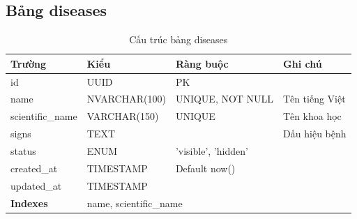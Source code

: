 \documentclass[12pt,a4paper]{article}
\begin{document}
\subsection{Bảng diseases}
\begin{longtable}{|l|l|l|p{5.5cm}|}
    \caption{Cấu trúc bảng diseases}                                                                        \\
    \hline
    \rowcolor{headerblue}
    \textbf{Trường}  & \textbf{Kiểu}                               & \textbf{Ràng buộc}  & \textbf{Ghi chú} \\
    \hline
    id               & UUID                                        & PK                  &                  \\
    \hline
    name             & NVARCHAR(100)                               & UNIQUE, NOT NULL    & Tên tiếng Việt   \\
    \hline
    scientific\_name & VARCHAR(150)                                & UNIQUE              & Tên khoa học     \\
    \hline
    signs            & TEXT                                        &                     & Dấu hiệu bệnh    \\
    \hline
    status           & ENUM                                        & 'visible', 'hidden' &                  \\
    \hline
    created\_at      & TIMESTAMP                                   & Default now()       &                  \\
    \hline
    updated\_at      & TIMESTAMP                                   &                     &                  \\
    \hline
    \rowcolor{headerblue}
    \textbf{Indexes} & \multicolumn{3}{l|}{name, scientific\_name}                                          \\
    \hline
\end{longtable}
\end{document}
